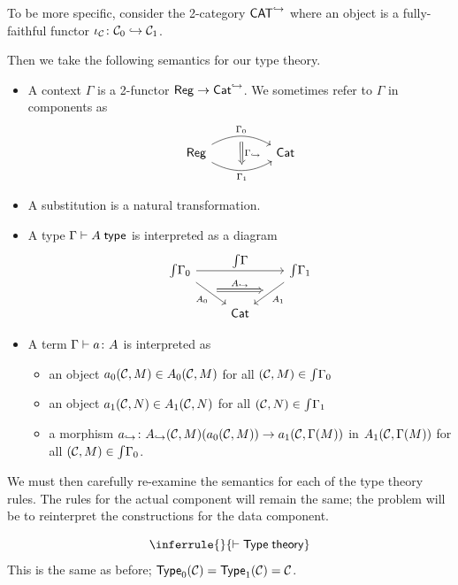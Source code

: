 \documentclass{article}
\begin{document}
To be more specific, consider the 2-category $\mathsf{CAT}^{\hookrightarrow}$ where an object is a fully-faithful functor $\iota_{\mathcal{C}} \colon \mathcal{C}_0 \hookrightarrow \mathcal{C}_1$.

Then we take the following semantics for our type theory.

\begin{itemize}
  \item A context $\Gamma$ is a 2-functor $\mathsf{Reg} \to \mathsf{Cat}^{\hookrightarrow}$. We sometimes refer to $\Gamma$ in components as
        \[\begin{tikzcd}
            \ms{Reg} \ar[rr,bend left, "\Gamma_0", ""'{name=0}] \ar[rr,bend right,"\Gamma_1"', ""{name=1}] && \ms{Cat}
            \arrow["\Gamma_{\mbox{\tiny $\into$}}", Rightarrow, from=0, to=1]
          \end{tikzcd}\]
  \item A substitution is a natural transformation.
  \item A type $\Gamma \vdash A \;\mathsf{type}$ is interpreted as a diagram
        \[\begin{tikzcd}
            \groth \Gamma_0 \ar[rr, "\groth \Gamma"] \ar[""{name=0}, "A_0"', rd] && \groth \Gamma_1 \ar[""'{name=1}, "A_1", ld] \\
            & \ms{Cat}
            \arrow["A_{\into}", Rightarrow, from=0, to=1]
            \end{tikzcd}\]
  \item A term $\Gamma \vdash a \colon A$ is interpreted as
        \begin{itemize}
          \item an object $a_0(\mathcal{C},M) \in A_0(\mathcal{C},M)$ for all $(\mathcal{C},M) \in \textstyle{\int} \Gamma_0$
          \item an object $a_1(\mathcal{C},N) \in A_1(\mathcal{C},N)$ for all $(\mathcal{C},N) \in \textstyle{\int} \Gamma_1$
          \item a morphism $a_{\hookrightarrow} \colon A_{\hookrightarrow}(\mathcal{C},M)(a_0(\mathcal{C},M)) \to a_1(\mathcal{C}, \Gamma(M))$ in $A_1(\mathcal{C},\Gamma(M))$ for all $(\mathcal{C},M) \in \textstyle{\int} \Gamma_0$.
        \end{itemize}
\end{itemize}

We must then carefully re-examine the semantics for each of the type theory rules. The rules for the actual component will remain the same; the problem will be to reinterpret the constructions for the data component.

\begin{ttrule}
  \[\inferrule{}{\yields \ms{Type} \jdg{theory}}\]
  This is the same as before; $\mathsf{Type}_0(\mathcal{C}) = \mathsf{Type}_1(\mathcal{C}) = \mathcal{C}$.
\end{ttrule}
\end{document}
